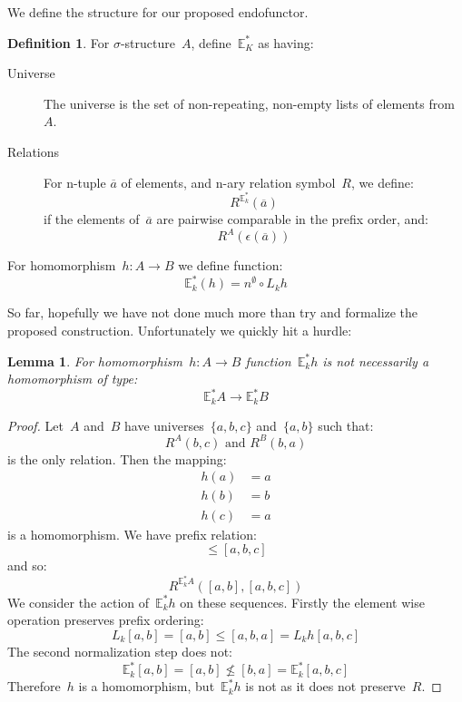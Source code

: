 \documentclass{article}
\theoremstyle{plain}
\newtheorem{lemma}[theorem]{Lemma}
\theoremstyle{definition}
\newtheorem{definition}[theorem]{Definition}
\theoremstyle{remark}
\numberwithin{theorem}{section}
\begin{document}
We define the structure for our proposed endofunctor.
\begin{definition}
For $\sigma$-structure~$A$, define~$\mathbb{E}^*_K$ as having:
\begin{description}
\item[Universe] The universe is the set of non-repeating, non-empty lists of elements from~$A$.
\item[Relations] For n-tuple $\overline{a}$ of elements, and n-ary relation symbol~$R$, we define:
\begin{equation*}
    R^{\mathbb{E}^*_k}(\overline{a})
\end{equation*}
if the elements of~$\overline{a}$ are pairwise comparable in the prefix order, and:
\begin{equation*}
    R^A(\epsilon(\overline{a}))
\end{equation*}
\end{description}
For homomorphism~$h : A \rightarrow B$ we define function:
\begin{equation*}
    \mathbb{E}^*_k(h) = n^\emptyset \circ L_k h
\end{equation*}
\end{definition}
So far, hopefully we have not done much more than try and formalize the proposed construction. Unfortunately we quickly hit a hurdle:
\begin{lemma}
For homomorphism~$h : A \rightarrow B$ function~$\mathbb{E}^*_k h$ is not necessarily a homomorphism of type:
\begin{equation*}
    \mathbb{E}^*_k A \rightarrow \mathbb{E}^*_k B
\end{equation*}
\end{lemma}
\begin{proof}
Let~$A$ and~$B$ have universes~$\{a,b,c\}$ and~$\{a,b\}$ such that:
\begin{equation*}
    R^A(b,c) \mbox{ and } R^B(b,a)
\end{equation*}
is the only relation. Then the mapping:
\begin{align*}
    h(a) &= a\\
    h(b) &= b\\
    h(c) &= a
\end{align*}
is a homomorphism. We have prefix relation:
\begin{equation*}
    [a,b] \leq [a,b,c]
\end{equation*}
and so:
\begin{equation*}
    R^{\mathbb{E}^*_k A}([a,b], [a,b,c])
\end{equation*}
We consider the action of~$\mathbb{E}^*_k h$ on these sequences. Firstly the element wise operation preserves prefix ordering:
\begin{equation*}
    L_k [a,b] = [a,b] \leq [a,b,a] = L_k h [a,b,c]
\end{equation*}
The second normalization step does not:
\begin{equation*}
    \mathbb{E}^*_k [a,b] = [a,b] \not\leq [b,a] = \mathbb{E}^*_k [a,b,c]
\end{equation*}
Therefore~$h$ is a homomorphism, but~$\mathbb{E}^*_k h$ is not as it does not preserve~$R$.
\end{proof}
\end{document}
